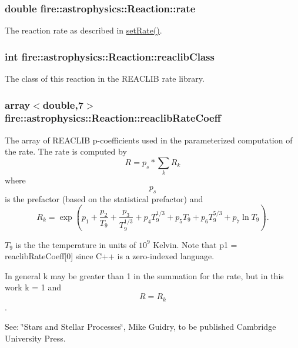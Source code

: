\subsubsection[{rate}]{\setlength{\rightskip}{0pt plus 5cm}double fire\+::astrophysics\+::\+Reaction\+::rate}\label{a00033_a343553d449e3cca261f8ee166fa6b699}
The reaction rate as described in \hyperlink{a00033_a671a0560e6843664cdae4d724b8645da}{set\+Rate()}. \hypertarget{a00033_a581b5410f62a299f2262324d6c0199c7}{}
\subsubsection[{reaclib\+Class}]{\setlength{\rightskip}{0pt plus 5cm}int fire\+::astrophysics\+::\+Reaction\+::reaclib\+Class}\label{a00033_a581b5410f62a299f2262324d6c0199c7}
The class of this reaction in the R\+E\+A\+C\+L\+I\+B rate library. \hypertarget{a00033_aa6265e73f4d2c55441caf95e6eb6e656}{}
\subsubsection[{reaclib\+Rate\+Coeff}]{\setlength{\rightskip}{0pt plus 5cm}array$<$double,7$>$ fire\+::astrophysics\+::\+Reaction\+::reaclib\+Rate\+Coeff}\label{a00033_aa6265e73f4d2c55441caf95e6eb6e656}
The array of R\+E\+A\+C\+L\+I\+B p-\/coefficients used in the parameterized computation of the rate. The rate is computed by \[ R = p_s*\sum_k R_k \] where \[p_s\] is the prefactor (based on the statistical prefactor) and \[ R_k = \exp(p_1 + \frac{p_2}{T_9} + \frac{p_3}{T_9^{1/3}} + p_{4}T_9^{1/3} + p_{5}T_9 + p_{6}T_9^{5/3} + p_{7}\ln T_9). \]

$T_9$ is the the temperature in units of $10^9$ Kelvin. Note that p1 = reaclib\+Rate\+Coeff\mbox{[}0\mbox{]} since C++ is a zero-\/indexed language.

In general k may be greater than 1 in the summation for the rate, but in this work k = 1 and \[R = R_k\].

See\+: \char`\"{}\+Stars and Stellar Processes\char`\"{}, Mike Guidry, to be published Cambridge University Press. \hypertarget{a00033_a831dcae79d4ed842c9bbdf51ebdd137f}{}
